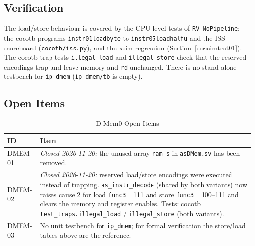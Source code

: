 \subsection{Verification}

The load/store behaviour is covered by the CPU-level tests of
\texttt{RV\_NoPipeline}: the cocotb programs \texttt{instr01loadbyte} to
\texttt{instr05loadhalfu} and the ISS scoreboard (\texttt{cocotb/iss.py}), and
the xsim regression (Section~\ref{sec:simtest01}). The cocotb trap tests
\texttt{illegal\_load} and \texttt{illegal\_store} check that the reserved
encodings trap and leave memory and \texttt{rd} unchanged. There is no stand-alone
testbench for \texttt{ip\_dmem} (\texttt{ip\_dmem/tb} is empty).

\subsection{Open Items}

\begin{table}[H]
\caption{D-Mem0 Open Items}
\label{tab:asDmemOpen}
\centering
\begin{tabularx}{\textwidth}{|l |X|}
  \hline
  ID & Item \\
  \hline
  \hline
  DMEM-01 & \emph{Closed 2026-11-20:} the unused array \texttt{ram\_s} in \texttt{asDMem.sv} has been removed. \\
  \hline
  DMEM-02 & \emph{Closed 2026-11-20:} reserved load/store encodings were executed instead
            of trapping. \texttt{as\_instr\_decode} (shared by both variants) now raises
            cause 2 for load \texttt{func3}\,=\,111 and store \texttt{func3}\,=\,100--111
            and clears the memory and register enables. Tests: cocotb
            \texttt{test\_traps.illegal\_load} / \texttt{illegal\_store} (both variants). \\
  \hline
  DMEM-03 & No unit testbench for \texttt{ip\_dmem}; for formal verification the
            store/load tables above are the reference. \\
  \hline
\end{tabularx}
\end{table}

